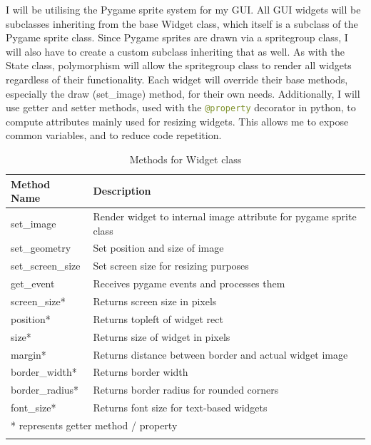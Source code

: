 \documentclass[../main/main.tex]{subfiles}
\begin{document}
I will be utilising the Pygame sprite system for my GUI. All GUI widgets will be subclasses inheriting from the base Widget class, which itself is a subclass of the Pygame sprite class.
Since Pygame sprites are drawn via a spritegroup class, I will also have to create a custom subclass inheriting that as well. As with the State class, polymorphism will allow the spritegroup class to render all widgets regardless of their functionality. Each widget will override their base methods, especially the draw (set\_image) method, for their own needs. Additionally, I will use getter and setter methods, used with the \lstinline[language=Python]{@property} decorator in python, to compute attributes mainly used for resizing widgets. This allows me to expose common variables, and to reduce code repetition.

\begin{longtable}[c]{l|l}
    \toprule
    \textbf{Method Name} & \textbf{Description}\\
    \midrule
    \endfirsthead
    \endhead

    set\_image & Render widget to internal image attribute for pygame sprite class\\
    set\_geometry & Set position and size of image\\
    set\_screen\_size & Set screen size for resizing purposes\\
    get\_event & Receives pygame events and processes them\\
    screen\_size* & Returns screen size in pixels\\
    position* & Returns topleft of widget rect\\
    size* & Returns size of widget in pixels\\
    margin* & Returns distance between border and actual widget image\\
    border\_width* & Returns border width\\
    border\_radius* & Returns border radius for rounded corners\\
    font\_size* & Returns font size for text-based widgets\\

    \midrule

    \multicolumn{2}{l}{* represents getter method / property}\\

    \bottomrule
    
\caption{Methods for Widget class}
\label{tab:widget-methods}
\end{longtable}
\end{document}
